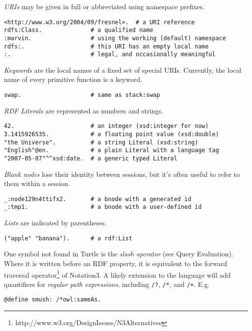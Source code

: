 \documentclass[runningheads]{llncs}
\begin{document}
\textit{URIs} may be given in full or abbreviated using namespace prefixes.
\begin{verbatim}
<http://www.w3.org/2004/09/fresnel>.  # a URI reference
rdfs:Class.              # a qualified name
:marvin.                 # using the working (default) namespace
rdfs:.                   # this URI has an empty local name
:.                       # legal, and occasionally meaningful
\end{verbatim}

\textit{Keywords} are the local names of a fixed set of special URIs.  Currently, the local name of every primitive function is a keyword.
\begin{verbatim}
swap.                    # same as stack:swap
\end{verbatim}

\textit{RDF Literals} are represented as numbers and strings.
\begin{verbatim}
42.                      # an integer (xsd:integer for now)
3.1415926535.            # a floating point value (xsd:double)
"the Universe".          # a string Literal (xsd:string)
"English"@en.            # a plain Literal with a language tag
"2007-05-07"^^xsd:date.  # a generic typed Literal
\end{verbatim}

\textit{Blank nodes} lose their identity between sessions, but it's often useful to refer to them within a session.
\begin{verbatim}
_:node129n4ttifx2.       # a bnode with a generated id
_:tmp1.                  # a bnode with a user-defined id
\end{verbatim}

\textit{Lists} are indicated by parentheses.
\begin{verbatim}
("apple" "banana").      # a rdf:List
\end{verbatim}

One symbol not found in Turtle is the \textit{slash operator} (see Query Evaluation).  Where it is written before an RDF property, it is equivalent to the forward traversal operator\footnote{http://www.w3.org/DesignIssues/N3Alternatives} of Notation3.  A likely extension to the language will add quantifiers for \textit{regular path expressions}, including \texttt{/?}, \texttt{/*}, and \texttt{/+}.  E.g.
\begin{verbatim}
@define smush: /*owl:sameAs.
\end{verbatim}
\end{document}
